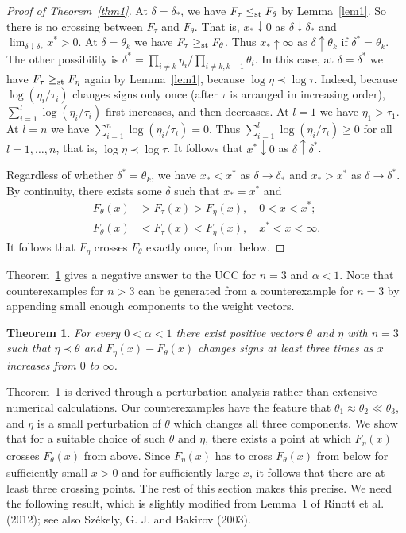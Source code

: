 \documentclass[11pt]{article}
\newtheorem{theorem}{\bf Theorem}
\begin{document}
\begin{proof}[Proof of Theorem~\ref{thm1}]
 At $\delta = \delta_*$, we have $F_\tau\leq_{\rm st} F_\theta$ by Lemma~\ref{lem1}.  So there is no crossing between $F_\tau$ and $F_\theta$.  That is, $x_*\downarrow 0$ as $\delta\downarrow \delta_*$ and $\lim_{\delta\downarrow \delta_*} x^* >0$.  At $\delta = \theta_k$ we have $F_\tau\geq_{\rm st} F_\theta$.  Thus $x_*\uparrow \infty$ as $\delta\uparrow \theta_k$ if $\delta^*=\theta_k$.  The other possibility is 
 $\delta^* = \prod_{i\neq k} \eta_i/\prod_{i\neq k, k-1} \theta_i$.  In this case, at $\delta=\delta^*$ we have $F_\tau\geq_{\rm st} F_\eta$ again by Lemma~\ref{lem1}, because $\log\eta\prec \log\tau$.  Indeed, because $\log(\eta_i/\tau_i)$ changes signs only once (after $\tau$ is arranged in increasing order), $\sum_{i=1}^l \log(\eta_i/\tau_i)$ first increases, and then decreases.  At $l=1$ we have $\eta_1>\tau_1$.  At $l=n$ we have $\sum_{i=1}^n \log(\eta_i/ \tau_i) = 0$.  Thus $\sum_{i=1}^l \log(\eta_i/ \tau_i) \geq 0$ for all $l=1,\ldots, n$, that is, $\log\eta\prec\log\tau$. It follows that $x^*\downarrow 0$ as $\delta\uparrow \delta^*$.  
 
Regardless of whether $\delta^*=\theta_k$, we have $x_*< x^*$ as $\delta\to \delta_*$ and $x_* > x^*$ as $\delta\to \delta^*$.  By continuity, there exists some $\delta$ such that $x_*=x^*$ and 
 \begin{align*}
 F_\theta(x) &> F_\tau(x)> F_\eta(x),\quad 0<x<x^*;\\
 F_\theta(x) &< F_\tau(x)< F_\eta(x),\quad x^*<x<\infty.
 \end{align*}
It follows that $F_\eta$ crosses $F_\theta$ exactly once, from below. 
\end{proof}

Theorem~\ref{thm2} gives a negative answer to the UCC for $n=3$ and $\alpha < 1$.  Note that counterexamples for $n>3$ can be generated from a counterexample for $n=3$ by appending small enough components to the weight vectors.

\begin{theorem}
\label{thm2}
For every $0<\alpha < 1$ there exist positive vectors $\theta$ and $\eta$ with $n=3$ such that $\eta\prec \theta$ and $F_\eta(x) -F_\theta(x)$ changes signs at least three times as $x$ increases from $0$ to $\infty$. 
\end{theorem}
Theorem~\ref{thm2} is derived through a perturbation analysis rather than extensive numerical calculations.  Our counterexamples have the feature that $\theta_1 \approx \theta_2 \ll \theta_3$, and $\eta$ is a small perturbation of $\theta$ which changes all three components.  We show that for a suitable choice of such $\theta$ and $\eta$, there exists a point at which $F_\eta(x)$ crosses $F_\theta(x)$ from above.  Since $F_\eta(x)$ has to cross $F_\theta(x)$ from below for sufficiently small $x> 0$ and for sufficiently large $x$, it follows that there are at least three crossing points.  The rest of this section makes this precise.  We need the following result, which is slightly modified from Lemma~1 of Rinott et al. (2012); see also Sz\'{e}kely, G. J. and Bakirov (2003). 
\end{document}
